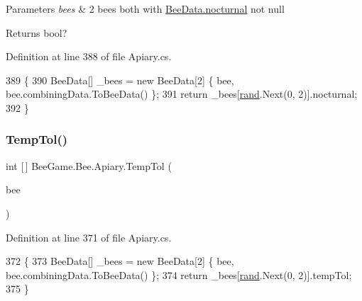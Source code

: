 \begin{DoxyParams}{Parameters}
{\em bees} & 2 bees both with \hyperlink{struct_bee_game_1_1_bee_1_1_bee_data_a4cd90eee8d255726d982116f14b444b2}{Bee\+Data.\+nocturnal} not null\\
\hline
\end{DoxyParams}
\begin{DoxyReturn}{Returns}
bool?
\end{DoxyReturn}


Definition at line 388 of file Apiary.\+cs.


\begin{DoxyCode}
389         \{
390             BeeData[] \_bees = \textcolor{keyword}{new} BeeData[2] \{ bee, bee.combiningData.ToBeeData() \};
391             \textcolor{keywordflow}{return} \_bees[\hyperlink{class_bee_game_1_1_bee_1_1_apiary_a272ac8b385ad3a7cd358b0959d561be7}{rand}.Next(0, 2)].nocturnal;
392         \}
\end{DoxyCode}
\mbox{\label{class_bee_game_1_1_bee_1_1_apiary_a09fe0446372a57b69863b432e0fdee5e}} 
\subsubsection{\texorpdfstring{Temp\+Tol()}{TempTol()}}
{\footnotesize\ttfamily int \mbox{[}$\,$\mbox{]} Bee\+Game.\+Bee.\+Apiary.\+Temp\+Tol (\begin{DoxyParamCaption}\item[{\hyperlink{struct_bee_game_1_1_bee_1_1_bee_data}{Bee\+Data}}]{bee }\end{DoxyParamCaption})\hspace{0.3cm}{\ttfamily [private]}}



Definition at line 371 of file Apiary.\+cs.


\begin{DoxyCode}
372         \{
373             BeeData[] \_bees = \textcolor{keyword}{new} BeeData[2] \{ bee, bee.combiningData.ToBeeData() \};
374             \textcolor{keywordflow}{return} \_bees[\hyperlink{class_bee_game_1_1_bee_1_1_apiary_a272ac8b385ad3a7cd358b0959d561be7}{rand}.Next(0, 2)].tempTol;
375         \}
\end{DoxyCode}
\mbox{\label{class_bee_game_1_1_bee_1_1_apiary_abdaff537d5798876ccbcb8dff82df4d7}} 
